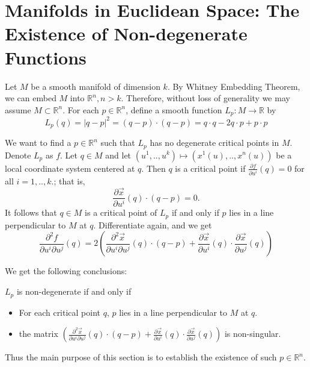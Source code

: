 \documentclass[a4paper,11pt,reqno]{amsart}
\newcommand{\RR}{\mathbb{R}}      %
\newcommand{\vect}[1]{\vec{#1}}
\begin{document}
\section{Manifolds in Euclidean Space: The Existence of Non-degenerate
  Functions}

Let $M$ be a smooth manifold of dimension $k$. By Whitney Embedding Theorem, we
can embed $M$ into $\RR^n, n > k$. Therefore, without loss of generality we may
assume $M \subset \RR^n$. For each $p \in \RR^n$, define a smooth function $L_p
: M \to \RR $ by
\begin{equation}
  L_p(q) = |q-p|^2 = (q-p) \cdot (q-p) = q\cdot q-2q \cdot p + p \cdot p
\end{equation}

We want to find a $p \in \RR^n$ such that $L_p$ has no degenerate critical
points in $M$. Denote $L_p$ as $f$. Let $q \in M$ and let $(u^1, .., u^k)
\mapsto (x^1(u), .., x^n(u))$ be a local coordinate system centered at $q$. Then $q$ is
a critical point if $\frac{\partial f}{\partial u^i}(q) = 0$ for all $i = 1, ..,
k.$; that is,
\begin{equation}
  \frac{\partial \vect{x}}{\partial u^i}(q) \cdot (q-p) = 0.
\end{equation}
It follows that $q \in M$ is a critical point of $L_p$ if and only if $p$ lies
in a line perpendicular to $M$ at $q$. Differentiate again, and we get
\begin{equation}
  \frac{\partial^2 f}{\partial u^i \partial u^j}(q) = 
  2\left(
    \frac{\partial^2 \vect{x}}{\partial u^i \partial u^j}(q) \cdot (q-p) +
    \frac{\partial \vect{x}}{\partial u^i}(q) \cdot \frac{\partial \vect{x}}{\partial u^j}(q)
  \right)
\end{equation}

We get the following conclusions:


$L_p$ is non-degenerate if and only if

\begin{itemize}
\item For each critical point $q$, $p$ lies in a line perpendicular to $M$ at
  $q$.
\item the matrix $\left(
    \frac{\partial^2 \vect{x}}{\partial u^i \partial u^j}(q) \cdot (q-p) +
    \frac{\partial \vect{x}}{\partial u^i}(q) \cdot \frac{\partial \vect{x}}{\partial u^j}(q)
  \right)$
  is non-singular.
\end{itemize}

Thus the main purpose of this section is to establish the existence of such $p
\in \RR^n$.
\end{document}
